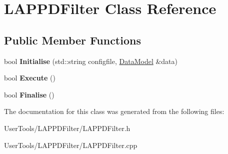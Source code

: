 \hypertarget{classLAPPDFilter}{
\section{LAPPDFilter Class Reference}
\label{classLAPPDFilter}
}
\subsection*{Public Member Functions}
\begin{DoxyCompactItemize}
\item 
\hypertarget{classLAPPDFilter_a43acf78f4842009ea98dbea3cc8dcaee}{
bool {\bfseries Initialise} (std::string configfile, \hyperlink{classDataModel}{DataModel} \&data)}
\label{classLAPPDFilter_a43acf78f4842009ea98dbea3cc8dcaee}

\item 
\hypertarget{classLAPPDFilter_a1aea3cb930e491d79248dd24ecd703c8}{
bool {\bfseries Execute} ()}
\label{classLAPPDFilter_a1aea3cb930e491d79248dd24ecd703c8}

\item 
\hypertarget{classLAPPDFilter_a5d6a46a70be7f2320fe3fe401d3efeba}{
bool {\bfseries Finalise} ()}
\label{classLAPPDFilter_a5d6a46a70be7f2320fe3fe401d3efeba}

\end{DoxyCompactItemize}


The documentation for this class was generated from the following files:\begin{DoxyCompactItemize}
\item 
UserTools/LAPPDFilter/LAPPDFilter.h\item 
UserTools/LAPPDFilter/LAPPDFilter.cpp\end{DoxyCompactItemize}
